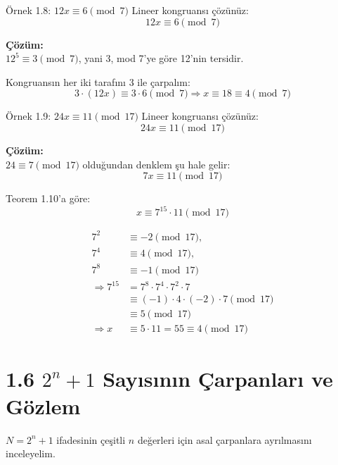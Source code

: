 \begin{examplebox}{Örnek 1.8: $12x \equiv 6 \pmod{7}$}
Lineer kongruansı çözünüz:
\[
12x \equiv 6 \pmod{7}
\]

\textbf{Çözüm:}\\
$12^5 \equiv 3 \pmod{7}$, yani 3, mod 7'ye göre 12'nin tersidir.

Kongruansın her iki tarafını 3 ile çarpalım:
\[
3 \cdot (12x) \equiv 3 \cdot 6 \pmod{7} \Rightarrow x \equiv 18 \equiv 4 \pmod{7}
\]
\end{examplebox}

\begin{examplebox}{Örnek 1.9: $24x \equiv 11 \pmod{17}$}
Lineer kongruansı çözünüz:
\[
24x \equiv 11 \pmod{17}
\]

\textbf{Çözüm:}\\
$24 \equiv 7 \pmod{17}$ olduğundan denklem şu hale gelir:
\[
7x \equiv 11 \pmod{17}
\]

Teorem 1.10'a göre:
\[
x \equiv 7^{15} \cdot 11 \pmod{17}
\]

\begin{align*}
7^2 &\equiv -2 \pmod{17}, \\
7^4 &\equiv 4 \pmod{17}, \\
7^8 &\equiv -1 \pmod{17} \\
\Rightarrow 7^{15} &= 7^8 \cdot 7^4 \cdot 7^2 \cdot 7 \\
&\equiv (-1) \cdot 4 \cdot (-2) \cdot 7 \pmod{17} \\
&\equiv 5 \pmod{17} \\
\Rightarrow x &\equiv 5 \cdot 11 = 55 \equiv 4 \pmod{17}
\end{align*}
\end{examplebox}

\clearpage
\section*{1.6 $2^n + 1$ Sayısının Çarpanları ve Gözlem}

$N = 2^n + 1$ ifadesinin çeşitli $n$ değerleri için asal çarpanlara ayrılmasını inceleyelim.

